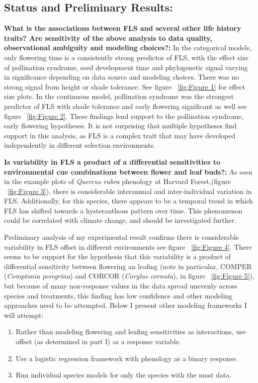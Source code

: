 \documentclass{article}\usepackage[]{graphicx}\usepackage[]{color}
\begin{document}
\subsection*{Status and Preliminary Results:}
\indent\indent\textbf{What is the associations between FLS and several other life history traits?  Are sensitivity of the above analysis to data quality, observational ambiguity and modeling choices?:} In the categorical models, only flowering time is a consistently strong predictor of FLS, with the effect size of pollination syndrome, seed development time and phylogenetic signal varying in significance depending on data source and modeling choices. There was no strong signal from height or shade tolerance. See figure ~\ref{fig:Figure 1} for effect size plots.
In the continuous model, pollination syndrome was the strongest predictor of FLS with shade tolerance and early flowering significant as well see figure ~\ref{fig:Figure 2}. These findings lend support to the pollination syndrome, early flowering hypotheses. It is not surprising that multiple hypotheses find support in this analysis, as FLS is a complex trait that may have developed independently in different selection environments.
\par\textbf{Is variability in FLS a product of a differential sensitivities to environmental cue combinations between flower and leaf buds?:} As seen in the  example plots of \textit{Quercus rubra} phenology at Harvard Forest,(figure ~\ref{fig:Figure 3}), there is considerable interannual and inter-individual variation in FLS. Additionally, for this species, there appears to be a temporal trend in which FLS has shifted towards a hysteranthous pattern over time. This phenomenon could be correlated with climate change, and should be investigated further.
\par Preliminary analysis of my experimental result confirms there is considerable variability in FLS offset in different environments see figure ~\ref{fig:Figure 4}.  There seems to be support for the hypothesis that this variability is a product of differential sensitivity between flowering an leafing (note in particular, COMPER (\textit{Comptonia peregrina}) and CORCOR (\textit{Corylus cornuta}), in figure ~\ref{fig:Figure 5}), but because of many non-response values in the data spread unevenly across species and treatments, this finding has low confidence and other modeling approaches need to be attempted. Below I present other modeling frameworks I will attempt:
\begin{enumerate}
\item Rather than modeling flowering and leafing sensitivities as interactions, use offset (as determined in part I) as a response variable.
\item Use a logistic regression framework with phenology as a binary response.
\item Run individual species models for only the species with the most data.
\end{enumerate}
\end{document}
